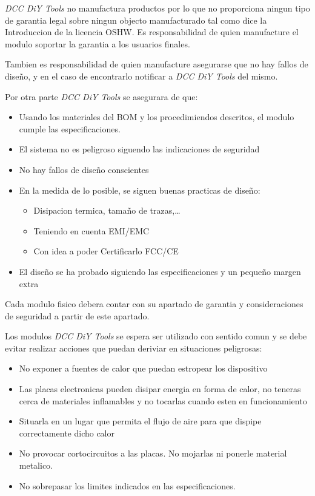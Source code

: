 \textit{DCC DiY Tools} no manufactura productos por lo que no proporciona ningun
tipo de garantia legal sobre ningun objecto manufacturado tal como dice la Introduccion
de la licencia OSHW. Es responsabilidad de quien manufacture el modulo soportar
la garantia a los usuarios finales.

Tambien es responsabilidad de quien manufacture asegurarse que no hay fallos de diseño,
y en el caso de encontrarlo notificar a \textit{DCC DiY Tools} del mismo.

Por otra parte \textit{DCC DiY Tools} se asegurara de que:
\begin{itemize}
    \item Usando los materiales del BOM y los procedimiendos descritos, el modulo
    cumple las especificaciones.
    \item El sistema no es peligroso siguendo las indicaciones de seguridad
    \item No hay fallos de diseño conscientes
    \item En la medida de lo posible, se siguen buenas practicas de diseño:
    \begin{itemize}
        \item Disipacion termica, tamaño de trazas,\dots
        \item Teniendo en cuenta EMI/EMC
        \item Con idea a poder Certificarlo FCC/CE
    \end{itemize}
    \item El diseño se ha probado siguiendo las especificaciones y un pequeño margen extra
\end{itemize}
 
Cada modulo fisico debera contar con su apartado de garantia y consideraciones
de seguridad a partir de este apartado. 

Los modulos \textit{DCC DiY Tools} se espera ser utilizado con sentido comun y se
debe evitar realizar acciones que puedan deriviar en situaciones peligrosas:
\begin{itemize}
    \item No exponer a fuentes de calor que puedan estropear los dispositivo
    \item Las placas electronicas pueden disipar energia en forma de calor, no
    teneras cerca de materiales inflamables y no tocarlas cuando esten en funcionamiento
    \item Situarla en un lugar que permita el flujo de aire para que dispipe
    correctamente dicho calor
    \item No provocar cortocircuitos a las placas. No mojarlas ni ponerle material metalico.
    \item No sobrepasar los limites indicados en las especificaciones.
\end{itemize}